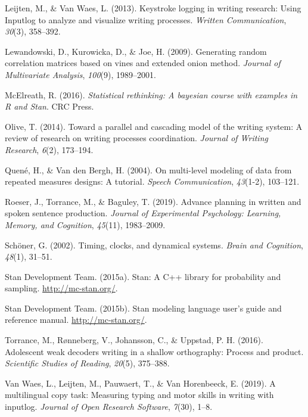 \documentclass[english,jou,floatsintext]{apa7}
\begin{document}
\leavevmode\hypertarget{ref-leijten2013keystroke}{}%
Leijten, M., \& Van Waes, L. (2013). Keystroke logging in writing research: Using Inputlog to analyze and visualize writing processes. \emph{Written Communication}, \emph{30}(3), 358--392.

\leavevmode\hypertarget{ref-lewandowski2009generating}{}%
Lewandowski, D., Kurowicka, D., \& Joe, H. (2009). Generating random correlation matrices based on vines and extended onion method. \emph{Journal of Multivariate Analysis}, \emph{100}(9), 1989--2001.

\leavevmode\hypertarget{ref-mcelreath2016statistical}{}%
McElreath, R. (2016). \emph{Statistical rethinking: A bayesian course with examples in R and Stan}. CRC Press.

\leavevmode\hypertarget{ref-olive2014toward}{}%
Olive, T. (2014). Toward a parallel and cascading model of the writing system: A review of research on writing processes coordination. \emph{Journal of Writing Research}, \emph{6}(2), 173--194.

\leavevmode\hypertarget{ref-quene2004multi}{}%
Quené, H., \& Van den Bergh, H. (2004). On multi-level modeling of data from repeated measures designs: A tutorial. \emph{Speech Communication}, \emph{43}(1-2), 103--121.

\leavevmode\hypertarget{ref-roeser2019advance}{}%
Roeser, J., Torrance, M., \& Baguley, T. (2019). Advance planning in written and spoken sentence production. \emph{Journal of Experimental Psychology: Learning, Memory, and Cognition}, \emph{45}(11), 1983--2009.

\leavevmode\hypertarget{ref-schoner2002timing}{}%
Schöner, G. (2002). Timing, clocks, and dynamical systems. \emph{Brain and Cognition}, \emph{48}(1), 31--51.

\leavevmode\hypertarget{ref-rstan}{}%
Stan Development Team. (2015a). Stan: A C++ library for probability and sampling. \url{http://mc-stan.org/}.

\leavevmode\hypertarget{ref-rstan2}{}%
Stan Development Team. (2015b). Stan modeling language user's guide and reference manual. \url{http://mc-stan.org/}.

\leavevmode\hypertarget{ref-torrance2016adolescent}{}%
Torrance, M., Rønneberg, V., Johansson, C., \& Uppstad, P. H. (2016). Adolescent weak decoders writing in a shallow orthography: Process and product. \emph{Scientific Studies of Reading}, \emph{20}(5), 375--388.

\leavevmode\hypertarget{ref-van2019multilingual}{}%
Van Waes, L., Leijten, M., Pauwaert, T., \& Van Horenbeeck, E. (2019). A multilingual copy task: Measuring typing and motor skills in writing with inputlog. \emph{Journal of Open Research Software}, \emph{7}(30), 1--8.
\end{document}
